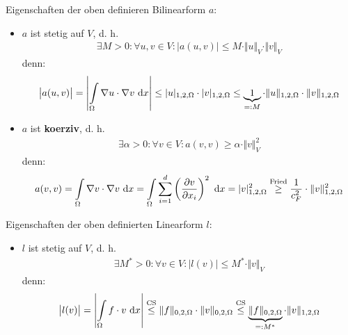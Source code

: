 Eigenschaften der oben definieren Bilinearform $a$:
\begin{itemize}
\item $a$ ist stetig auf $V$, d. h.
\begin{align*}
\exists M>0:\forall u,v\in V:\big|a(u,v)\big|\leq M\cdot\Vert u\Vert_V\cdot\Vert v\Vert_V
\end{align*}
denn:
\begin{align*}
\big| a(u,v)\big|=\left|\int\limits_\Omega\nabla u\cdot\nabla v\text{ d} x\right|
\leq
|u|_{1,2,\Omega}\cdot|v|_{1,2,\Omega}
\leq
\underbrace{1}_{=:M}\cdot\Vert u\Vert_{1,2,\Omega}\cdot\Vert v\Vert_{1,2,\Omega}
\end{align*}
\item $a$ ist \textbf{koerziv}, d. h.
\begin{align*}
\exists\alpha>0:\forall v\in V:a(v,v)\geq\alpha\cdot\Vert v\Vert^2_V
\end{align*} 
denn:
\begin{align*}
a(v,v)
=\int\limits_\Omega\nabla v\cdot\nabla v\text{ d} x
=\int\limits_\Omega\sum\limits_{i=1}^d\left(\frac{\partial v}{\partial x_i}\right)^2\text{ d} x
=|v|^2_{1,2,\Omega}
\stackrel{\text{Fried}}{\geq}
\frac{1}{c_F^2}\cdot\Vert v\Vert^2_{1,2,\Omega}
\end{align*}
\end{itemize}
Eigenschaften der oben definierten Linearform $l$:
\begin{itemize}
\item $l$ ist stetig auf $V$, d. h.
\begin{align*}
\exists M^\ast>0:\forall v\in V: \big|l(v)\big|\leq M^\ast\cdot\Vert v\Vert_V
\end{align*}
denn:
\begin{align*}
\big| l(v)\big|=\left|\int\limits_\Omega f\cdot v\text{ d} x\right|
\stackrel{\text{CS}}{\leq}
\Vert f\Vert_{0,2,\Omega}\cdot\Vert v\Vert_{0,2,\Omega}
\stackrel{\text{CS}}{\leq}
\underbrace{\Vert f\Vert_{0,2,\Omega}}_{=:M^\ast}\cdot\Vert v\Vert_{1,2,\Omega}
\end{align*}
\end{itemize}

